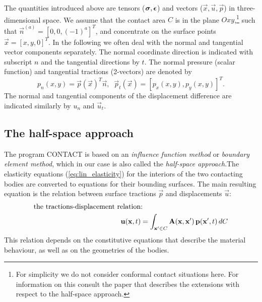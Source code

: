 \documentclass[12pt]{report}
\begin{document}
The quantities introduced above are tensors ($\boldsymbol{\sigma}, \boldsymbol{\epsilon}$) and
vectors ($\vec{x}, \vec{u}, \vec{p}$) in three-dimensional space. We assume
that the contact area $C$ is in the plane
$Oxy$,\footnote{\label{foot:conformal}For simplicity we do not consider
conformal contact situations here. For information on this consult the
paper \cite{Vollebregt2014d-conformal} that describes the extensions with
respect to the half-space approach.} such that
$\vec{n}^{(a)}= [0,0,(-1)^a]^T$, and concentrate on the surface points
$\vec{x}=[x,y,0]^T$. In the following we often deal with the normal
and tangential vector components separately. The normal coordinate direction
is indicated with subscript $n$ and the tangential directions by $t$.
The normal pressure (scalar function) and tangential tractions (2-vectors)
are denoted by
\begin{equation}
   p_n(x,y) = \vec{p}(\vec{x})^T \vec{n}, \;\;
   \vec{p}_t(\vec{x}) = [p_x(x,y), p_y(x,y)]^T .
\end{equation}
The normal and tangential components of the displacement difference are
indicated similarly by $u_n$ and $\vec{u}_t$.

\subsection{The half-space approach}

The program CONTACT is based on an {\em influence function method\/} or {\em
boundary element method\/}, which in our case is also called the {\em
half-space approach\/}.\footnotemark[1]
The elasticity equations (\ref{eq:lin_elasticity})
for the interiors of the two contacting bodies are converted to equations for
their bounding surfaces. The main resulting equation is the relation between
surface tractions $\vec{p}$ and displacements $\vec{u}$:
\begin{eqnarray}
\lefteqn{\mbox{the tractions-displacement relation:}} \nonumber \\
  & \mbox{\hspace{4cm}} & \vec{u}(\vec{x},t) =
        \int_{\vec{x}'\in C} \mat{A}(\vec{x},\vec{x}') \,
                \vec{p}(\vec{x}',t) \, dC          \label{eq:u_int_A_p}
\end{eqnarray}
This relation depends on the constitutive equations that describe the
material behaviour, as well as on the geometries of the bodies.
\end{document}
